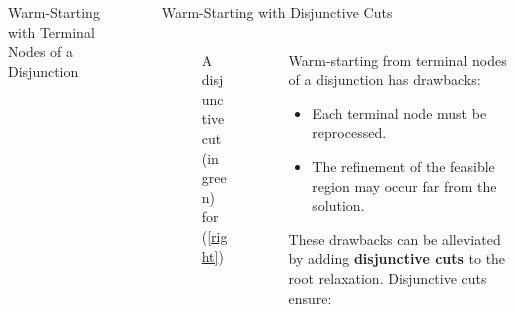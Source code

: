 \documentclass[final]{beamer}
\newlength{\sepwidth}
\newlength{\colwidth}
\newcommand{\separatorcolumn}{\begin{column}{\sepwidth}\end{column}}
\begin{document}
\begin{frame}[t]
\begin{columns}[t]
\begin{column}{\colwidth}
\begin{block}{Warm-Starting with Terminal Nodes of a Disjunction}
  \end{block}

\end{column}

\separatorcolumn

\begin{column}{\colwidth}

  \begin{block}{Warm-Starting with Disjunctive Cuts}

    \begin{columns}[T]
    	\begin{column}{0.4\textwidth}
    		\vspace{-.25cm}
    		\begin{figure}[h]
    			\caption{A disjunctive cut (in green) for (\ref{right})}
    			\label{p:hull}
    		\end{figure}
    	\end{column}
    	\begin{column}{0.6\textwidth}
   			Warm-starting from terminal nodes of a disjunction has drawbacks:
   			\begin{itemize}
   				\item Each terminal node must be reprocessed.
   				\item The refinement of the feasible region may occur far from the solution.
   			\end{itemize}
   			These drawbacks can be alleviated by adding \textbf{disjunctive cuts} to the root relaxation. Disjunctive cuts ensure:

\end{column}
\end{columns}
\end{block}
\end{column}
\end{columns}
\end{frame}
\end{document}
